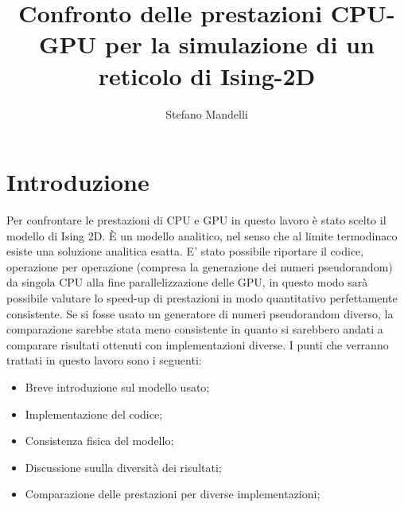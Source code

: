 \documentclass[a4paper,12pt]{article}
\begin{document}
\author{Stefano Mandelli}
\title{\bf \Huge Confronto delle prestazioni CPU-GPU per la simulazione di un reticolo di Ising-2D}
\date{}
\maketitle
\section*{Introduzione}
Per confrontare le prestazioni di CPU e GPU in questo lavoro è stato scelto il modello di Ising 2D. \`E un modello analitico, nel senso che al limite termodinaco esiste una soluzione analitica esatta. E' stato possibile riportare il codice, operazione per operazione (compresa la generazione dei numeri pseudorandom) da singola CPU alla fine parallelizzazione delle GPU, in questo modo sarà possibile valutare lo speed-up di prestazioni in modo quantitativo perfettamente consistente. Se si fosse usato un generatore di numeri pseudorandom diverso, la comparazione sarebbe stata meno consistente in quanto si sarebbero andati a comparare risultati ottenuti con implementazioni diverse. I punti che verranno trattati in questo lavoro sono i seguenti:
\begin{itemize}
	\item Breve introduzione sul modello usato;
	\item Implementazione del codice;
	\item Consistenza fisica del modello;
	\item Discussione suulla diversità dei risultati;
	\item Comparazione delle prestazioni per diverse implementazioni;
\end{itemize}
\end{document}
